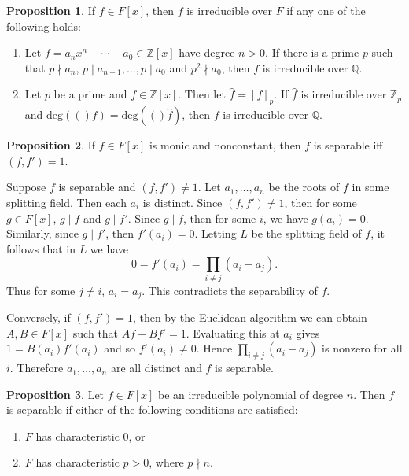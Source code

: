 \documentclass[leqno]{article}
\makeatletter
\newcommand{\deg}[1]{\text{deg}(#1)}
\theoremstyle{definition}
\newtheorem{prop}{Proposition}
\theoremstyle{remark}
\let\oldproofname=\proofname
\renewcommand{\proofname}{\textit{\oldproofname}}
\theoremstyle{definition}
\renewenvironment{proof}[1][\proofname]{\par
  \pushQED{\qed}%
  \normalfont \topsep6\p@\@plus6\p@\relax
  \list{}{\leftmargin=0mm
          \rightmargin=0mm
          \settowidth{\itemindent}{\itshape#1}%
          \labelwidth=\itemindent
          \parsep=0pt \listparindent=0mm%
  }
  \item[\hskip\labelsep
        \itshape
    #1\@addpunct{.}]\ignorespaces
}{%
  \popQED\endlist\@endpefalse
}
\makeatother
\begin{document}
    \begin{prop}
        If $f\in F[x]$, then $f$ is irreducible over $F$ if any one of the following holds:
            \begin{enumerate}
                \item Let $f=a_nx^n+\cdots+a_0\in\mathbb{Z}[x]$ have degree $n>0$. If there is a prime $p$ such that $p\nmid a_n$, $p\mid a_{n-1},\dots,p\mid a_0$ and $p^2\nmid a_0$, then $f$ is irreducible over $\mathbb{Q}$.
                \item Let $p$ be a prime and $f\in\mathbb{Z}[x]$. Then let $\hat{f}=[f]_p$. If $\hat{f}$ is irreducible over $\mathbb{Z}_p$ and $\deg(f)=\deg(\hat{f})$, then $f$ is irreducible over $\mathbb{Q}$.
            \end{enumerate}
    \end{prop}
    \begin{prop}
        If $f\in F[x]$ is monic and nonconstant, then $f$ is separable iff $(f,f')=1$.
    \end{prop}
        \begin{proof}
            Suppose $f$ is separable and $(f,f')\neq 1$. Let $a_1,\dots,a_n$ be the roots of $f$ in some splitting field. Then each $a_i$ is distinct. Since $(f,f')\neq 1$, then for some $g\in F[x]$, $g\mid f$ and $g\mid f'$. Since $g\mid f$, then for some $i$, we have $g(a_i)=0$. Similarly, since $g\mid f'$, then $f'(a_i)=0$. Letting $L$ be the splitting field of $f$, it follows that in $L$ we have
                \begin{equation*}
                    0=f'(a_i)=\prod_{i\neq j}(a_i-a_j).
                \end{equation*}
            Thus for some $j\neq i$, $a_i=a_j$. This contradicts the separability of $f$.\par\hspace{4mm} Conversely, if $(f,f')=1$, then by the Euclidean algorithm we can obtain $A,B\in F[x]$ such that $Af+Bf'=1$. Evaluating this at $a_i$ gives $1=B(a_i)f'(a_i)$ and so $f'(a_i)\neq 0$. Hence $\prod_{i\neq j}(a_i-a_j)$ is nonzero for all $i$. Therefore $a_1,\dots,a_n$ are all distinct and $f$ is separable.
        \end{proof}
    \begin{prop}
        Let $f\in F[x]$ be an irreducible polynomial of degree $n$. Then $f$ is separable if either of the following conditions are satisfied:
            \begin{enumerate}[label=(\alph*)]
                \item $F$ has characteristic 0, or
                \item $F$ has characteristic $p>0$, where $p\nmid n$.
            \end{enumerate}
    \end{prop}
\end{document}
